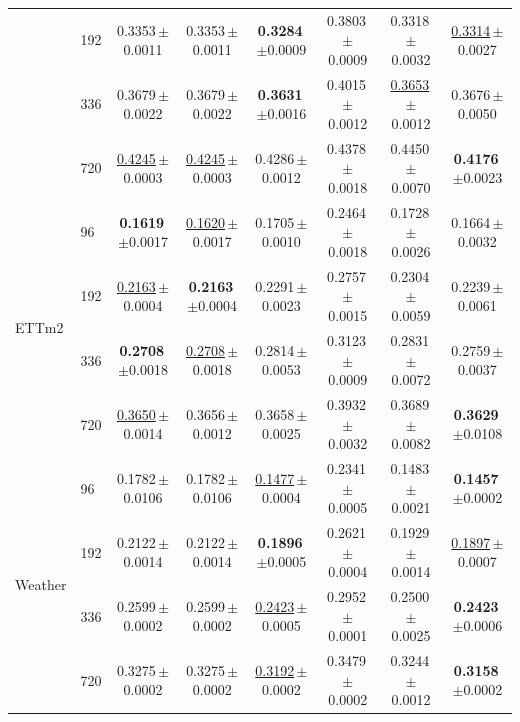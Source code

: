 \begin{tabular}{llcccccc}
 & 192 & 0.3353\,{\tiny$\pm$0.0011} & 0.3353\,{\tiny$\pm$0.0011} & \textbf{0.3284}\,{\tiny$\pm$0.0009} & 0.3803\,{\tiny$\pm$0.0009} & 0.3318\,{\tiny$\pm$0.0032} & \underline{0.3314}\,{\tiny$\pm$0.0027} \\
 & 336 & 0.3679\,{\tiny$\pm$0.0022} & 0.3679\,{\tiny$\pm$0.0022} & \textbf{0.3631}\,{\tiny$\pm$0.0016} & 0.4015\,{\tiny$\pm$0.0012} & \underline{0.3653}\,{\tiny$\pm$0.0012} & 0.3676\,{\tiny$\pm$0.0050} \\
 & 720 & \underline{0.4245}\,{\tiny$\pm$0.0003} & \underline{0.4245}\,{\tiny$\pm$0.0003} & 0.4286\,{\tiny$\pm$0.0012} & 0.4378\,{\tiny$\pm$0.0018} & 0.4450\,{\tiny$\pm$0.0070} & \textbf{0.4176}\,{\tiny$\pm$0.0023} \\
\midrule
\multirow{4}{*}{ETTm2} & 96 & \textbf{0.1619}\,{\tiny$\pm$0.0017} & \underline{0.1620}\,{\tiny$\pm$0.0017} & 0.1705\,{\tiny$\pm$0.0010} & 0.2464\,{\tiny$\pm$0.0018} & 0.1728\,{\tiny$\pm$0.0026} & 0.1664\,{\tiny$\pm$0.0032} \\
 & 192 & \underline{0.2163}\,{\tiny$\pm$0.0004} & \textbf{0.2163}\,{\tiny$\pm$0.0004} & 0.2291\,{\tiny$\pm$0.0023} & 0.2757\,{\tiny$\pm$0.0015} & 0.2304\,{\tiny$\pm$0.0059} & 0.2239\,{\tiny$\pm$0.0061} \\
 & 336 & \textbf{0.2708}\,{\tiny$\pm$0.0018} & \underline{0.2708}\,{\tiny$\pm$0.0018} & 0.2814\,{\tiny$\pm$0.0053} & 0.3123\,{\tiny$\pm$0.0009} & 0.2831\,{\tiny$\pm$0.0072} & 0.2759\,{\tiny$\pm$0.0037} \\
 & 720 & \underline{0.3650}\,{\tiny$\pm$0.0014} & 0.3656\,{\tiny$\pm$0.0012} & 0.3658\,{\tiny$\pm$0.0025} & 0.3932\,{\tiny$\pm$0.0032} & 0.3689\,{\tiny$\pm$0.0082} & \textbf{0.3629}\,{\tiny$\pm$0.0108} \\
\midrule
\multirow{4}{*}{Weather} & 96 & 0.1782\,{\tiny$\pm$0.0106} & 0.1782\,{\tiny$\pm$0.0106} & \underline{0.1477}\,{\tiny$\pm$0.0004} & 0.2341\,{\tiny$\pm$0.0005} & 0.1483\,{\tiny$\pm$0.0021} & \textbf{0.1457}\,{\tiny$\pm$0.0002} \\
 & 192 & 0.2122\,{\tiny$\pm$0.0014} & 0.2122\,{\tiny$\pm$0.0014} & \textbf{0.1896}\,{\tiny$\pm$0.0005} & 0.2621\,{\tiny$\pm$0.0004} & 0.1929\,{\tiny$\pm$0.0014} & \underline{0.1897}\,{\tiny$\pm$0.0007} \\
 & 336 & 0.2599\,{\tiny$\pm$0.0002} & 0.2599\,{\tiny$\pm$0.0002} & \underline{0.2423}\,{\tiny$\pm$0.0005} & 0.2952\,{\tiny$\pm$0.0001} & 0.2500\,{\tiny$\pm$0.0025} & \textbf{0.2423}\,{\tiny$\pm$0.0006} \\
 & 720 & 0.3275\,{\tiny$\pm$0.0002} & 0.3275\,{\tiny$\pm$0.0002} & \underline{0.3192}\,{\tiny$\pm$0.0002} & 0.3479\,{\tiny$\pm$0.0002} & 0.3244\,{\tiny$\pm$0.0012} & \textbf{0.3158}\,{\tiny$\pm$0.0002} \\

\end{tabular}
